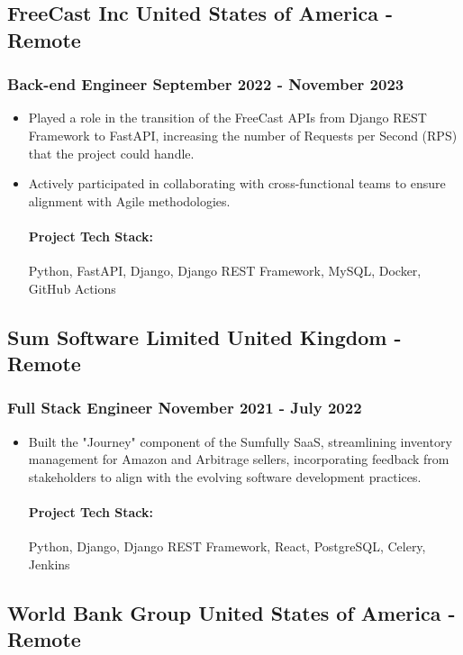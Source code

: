 \documentclass[11pt]{article} %
\begin{document}
\subsection{FreeCast Inc \hfill United States of America - Remote}
\subsubsection{Back-end Engineer \hfill  September 2022 - November 2023}
\begin{itemize}
    \item Played a role in the transition of the FreeCast APIs from Django REST Framework to FastAPI, increasing the number of Requests per Second (RPS) that the project could handle.
    \item Actively participated in collaborating with cross-functional teams to ensure alignment with Agile methodologies.

    \paragraph{Project Tech Stack:} Python, FastAPI, Django, Django REST Framework, MySQL, Docker, GitHub Actions
\end{itemize}

\subsection{Sum Software Limited \hfill United Kingdom - Remote}
\subsubsection{Full Stack Engineer \hfill  November 2021 - July 2022}
\begin{itemize}
    \item Built the "Journey" component of the Sumfully SaaS, streamlining inventory management for Amazon and Arbitrage sellers, incorporating feedback from stakeholders to align with the evolving software development practices.

    \paragraph{Project Tech Stack:} Python, Django, Django REST Framework, React, PostgreSQL, Celery, Jenkins
\end{itemize}


\subsection{World Bank Group \hfill United States of America - Remote}
\end{document}
